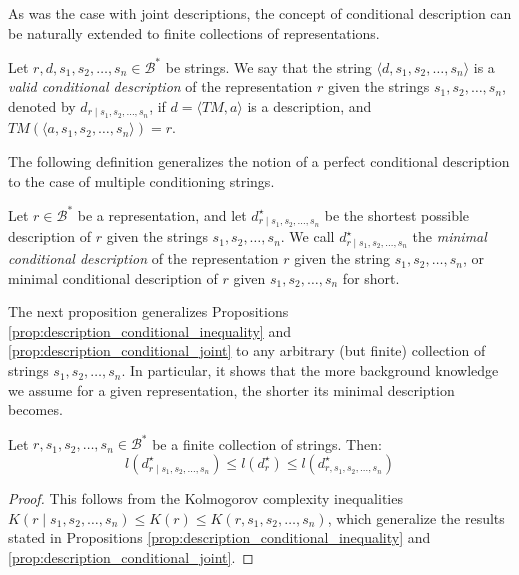 As was the case with joint descriptions, the concept of conditional description can be naturally extended to finite collections of representations.

\begin{definition}
Let $r, d, s_1, s_2, \ldots, s_n \in \mathcal{B}^\ast$ be strings. We say that the string $\langle d, s_1, s_2, \ldots, s_n \rangle$ is a \emph{valid conditional description} of the representation $r$ given the strings $s_1, s_2, \ldots, s_n$, denoted by $d_{r \mid s_1, s_2, \ldots, s_n}$, if $d = \langle TM, a \rangle$ is a description, and $TM \left(\langle a, s_1, s_2, \ldots, s_n \rangle \right) = r$.
\end{definition}

The following definition generalizes the notion of a perfect conditional description to the case of multiple conditioning strings.

\begin{definition}
Let $r \in \mathcal{B}^\ast$ be a representation, and let $d^\star_{r \mid s_1, s_2, \ldots, s_n}$ be the shortest possible description of $r$ given the strings $s_1, s_2, \ldots, s_n$. We call $d^\star_{r \mid s_1, s_2, \ldots, s_n}$ the \emph{minimal conditional description} of the representation $r$ given the string $s_1, s_2, \ldots, s_n$, or minimal conditional description of $r$ given $s_1, s_2, \ldots, s_n$ for short.
\end{definition}

The next proposition generalizes Propositions \ref{prop:description_conditional_inequality} and \ref{prop:description_conditional_joint} to any arbitrary (but finite) collection of strings $s_1, s_2, \ldots, s_n$. In particular, it shows that the more background knowledge we assume for a given representation, the shorter its minimal description becomes.

\begin{proposition}
Let $r, s_1, s_2, \ldots, s_n \in \mathcal{B}^\ast$ be a finite collection of strings. Then:
\[
l \left( d^\star_{r \mid s_1, s_2, \ldots, s_n} \right) \leq l \left( d^\star_r \right) \leq l \left( d^\star_{r,s_1, s_2, \ldots, s_n} \right)
\]
\end{proposition}
\begin{proof}
This follows from the Kolmogorov complexity inequalities $K(r \mid s_1, s_2, \ldots, s_n) \leq K(r) \leq K(r, s_1, s_2, \ldots, s_n)$, which generalize the results stated in Propositions \ref{prop:description_conditional_inequality} and \ref{prop:description_conditional_joint}.
\end{proof}


